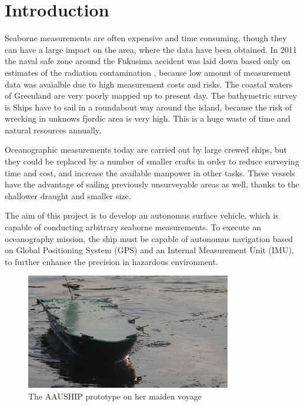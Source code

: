 \section*{Introduction}

Seaborne measurements are often expensive and time consuming, though they can have a large impact on the area, where the data have been obtained. In 2011 the naval safe zone around the Fukusima accident was laid down based only on estimates of the radiation contamination \cite{FNPP}, because low amount of measurement data was avaialble due to high measurement costs and risks. The coastal waters of Greenland are very poorly mapped up to present day. The bathymetric survey is Ships have to sail in a roundabout way around the island, because the risk of wrecking in unknows fjordic area is very high. This is a huge waste of time and natural resources annually.

Oceanographic measurements today are carried out by large crewed ships, but they could be replaced by a number of smaller crafts in order to reduce surveying time and cost, and increase the available manpower in other tasks. These vessels have the advantage of sailing previously unsurveyable areas as well, thanks to the shallower draught and smaller size.

The aim of this project is to develop an autonomus surface vehicle, which is capable of conducting arbitrary seaborne measurements. To execute an oceanography mission, the ship must be capable of autonomus navigation based on Global Positioning System (GPS) and an Internal Measurement Unit (IMU), to further enhance the precision in hazardous environment.

\begin{figure}[H]
	\centering
	\includegraphics[width=0.8\textwidth]{img/aauship}
	\caption{The AAUSHIP prototype on her maiden voyage}
	\label{fig:aauship}
\end{figure}

